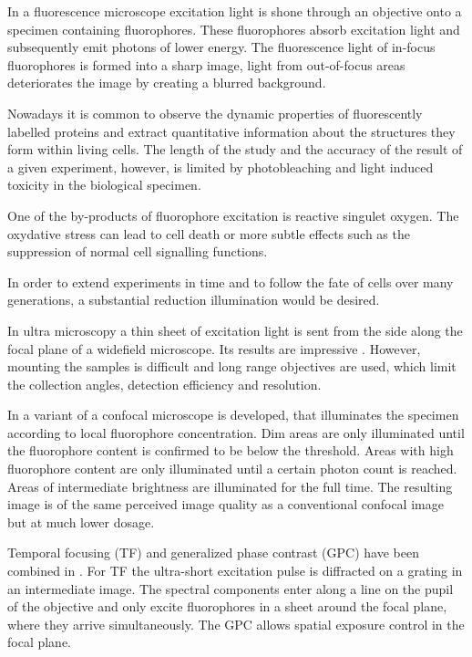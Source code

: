 \documentclass[a4paper, 11pt]{article}
\begin{document}
\begin{multicols}{2}


In a fluorescence microscope excitation light is shone through an
objective onto a specimen containing fluorophores. These fluorophores
absorb excitation light and subsequently emit photons of lower
energy. The fluorescence light of in-focus fluorophores is formed into
a sharp image, light from out-of-focus areas deteriorates the image by
creating a blurred background.

Nowadays it is common to observe the dynamic properties of
fluorescently labelled proteins and extract quantitative information
about the structures they form within living cells. The length of the
study and the accuracy of the result of a given experiment, however,
is limited by photobleaching and light induced toxicity in the
biological specimen.

One of the by-products of fluorophore excitation is reactive singulet
oxygen. The oxydative stress can lead to cell death or more subtle
effects such as the suppression of normal cell signalling functions.

In order to extend experiments in time and to follow the fate of cells
over many generations, a substantial reduction illumination would be
desired.

In ultra microscopy a thin sheet of excitation light is sent from the
side along the focal plane of a widefield microscope. Its results are
impressive \cite{Huisken2004}. However, mounting the samples is
difficult and long range objectives are used, which limit the
collection angles, detection efficiency and resolution.

In \cite{Hoebe2007} a variant of a confocal microscope is developed,
that illuminates the specimen according to local fluorophore
concentration. Dim areas are only illuminated until the fluorophore
content is confirmed to be below the threshold. Areas with high
fluorophore content are only illuminated until a certain photon count
is reached. Areas of intermediate brightness are illuminated for the
full time. The resulting image is of the same perceived image quality
as a conventional confocal image but at much lower dosage.

Temporal focusing (TF) and generalized phase contrast (GPC) have been
combined in \cite{Papagiakoumou2010}. For TF the ultra-short
excitation pulse is diffracted on a grating in an intermediate
image. The spectral components enter along a line on the pupil of the
objective and only excite fluorophores in a sheet around the focal
plane, where they arrive simultaneously. The GPC allows spatial
exposure control in the focal plane.


\end{multicols}
\end{document}
